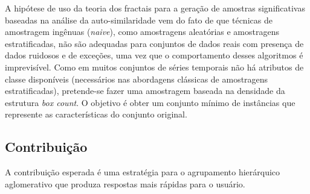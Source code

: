 A hipótese de uso da teoria dos fractais para a geração de amostras
significativas baseadas na análise da auto-similaridade vem do fato de que
técnicas de amostragem ingênuas (\textit{naive}), como amostragens aleatórias e
amostragens estratificadas, não são adequadas para conjuntos de dados reais com
presença de dados ruidosos e de exceções, uma vez que o comportamento desses
algoritmos é imprevisível. Como em muitos conjuntos de séries temporais não há
atributos de classe disponíveis (necessários nas abordagens clássicas de
amostragens estratificadas), pretende-se fazer uma amostragem baseada na
densidade da estrutura \textit{box count}. O objetivo é obter um conjunto mínimo
de instâncias que represente as características do conjunto original.

\subsection{Contribuição}
	\label{subsec:contribuicao}

A contribuição esperada é uma estratégia para o agrupamento hierárquico
aglomerativo que produza respostas mais rápidas para o usuário.

